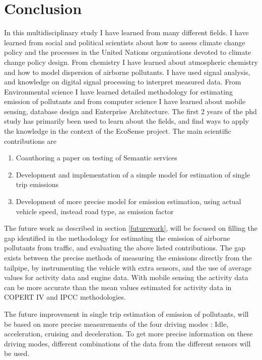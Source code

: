 \section{Conclusion}



In this multidisciplinary study I have learned from many different fields. I have learned from social and political scientists about how to assess climate change policy and the processes in the United Nations organisations devoted to climate change policy design. From chemistry I have learned about atmospheric chemistry and how to model dispersion of airborne pollutants. I have used signal analysis, and knowledge on digital signal processing to interpret measured data. From Environmental science I have learned detailed methodology for estimating emission of pollutants and from computer science I have learned about mobile sensing, database design and Enterprise Architecture.
The first 2 years of the phd study has primarily been used to learn about the fields, and find ways to apply the knowledge in the context of the EcoSense project.
The main scientific contributions are
\begin{enumerate}
	\item{Coauthoring a paper on testing of Semantic services}
	\item{Development and implementation of a simple model for estimation of single trip emissions}
	\item{Development of more precise model for emission estimation, using actual vehicle speed, instead road type, as emission factor}
\end{enumerate}
The future work as described in section \ref{futurework}, will be focused on filling the gap identified in the methodology for estimating the emission of airborne pollutants from traffic, and evaluating the above listed contributions. The gap exists between the precise methods of measuring the  emissions directly from the tailpipe, by instrumenting the vehicle with extra sensors, and the use of average values for activity data and engine data. With mobile sensing the activity data can be more accurate than the mean values estimated for activity data in COPERT IV and IPCC methodologies.

The future improvement in single trip estimation of emission of pollutants, will be based on more precise measurements of the four driving modes : Idle, acceleration, cruising and deceleration. To get more precise information on these driving modes, different combinations of the data from the different sensors will be used.

